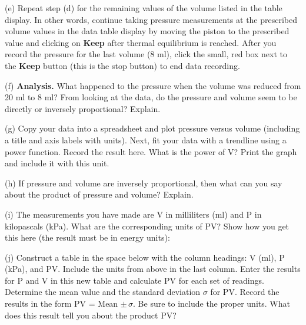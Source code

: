 (e) Repeat step (d) for the remaining values of the volume listed in the table
display. In other words, continue taking pressure measurements at the prescribed
volume values in the data table display by moving the piston to the prescribed
value and clicking on {\bf Keep} after thermal equilibrium is reached. After you record
the pressure for the last volume (8 ml), click the small, red box next to the
{\bf Keep} button (this is the stop button) to end data recording.

(f) \textbf{Analysis.} What happened to the pressure when the volume was 
reduced from 20 ml to 8 ml? From looking at the data, do the pressure and 
volume seem to be directly or inversely proportional? Explain.
\vspace{25mm}

(g) Copy your data into a spreadsheet and plot pressure versus volume 
(including a title and axis labels with units). Next, fit your data with a 
trendline using a power function. Record the result here. What is the power of 
V? Print the graph and include it with this unit.
\vspace{25mm}

(h) If pressure and volume are inversely proportional, then what can you say
about the product of pressure and volume? Explain.
\vspace{25mm}

\newpage

(i) The measurements you have made are V in milliliters (ml) and P in 
kilopascals (kPa). What are the corresponding units of PV? Show how you get 
this here (the result must be in energy units):
\vspace{40mm}

(j) Construct a table in the space below with the column headings: V (ml), P
(kPa), and PV. Include the units from above in the last column.
Enter the results for P and V in this new table and calculate
PV for each set of readings. Determine the mean value and the standard deviation
\( \sigma  \) for PV. Record the results in the form 
PV = Mean \( \pm \, \sigma  \). Be sure to include the proper units. 
What does this result tell you about the  product PV?

\vspace{12cm}

